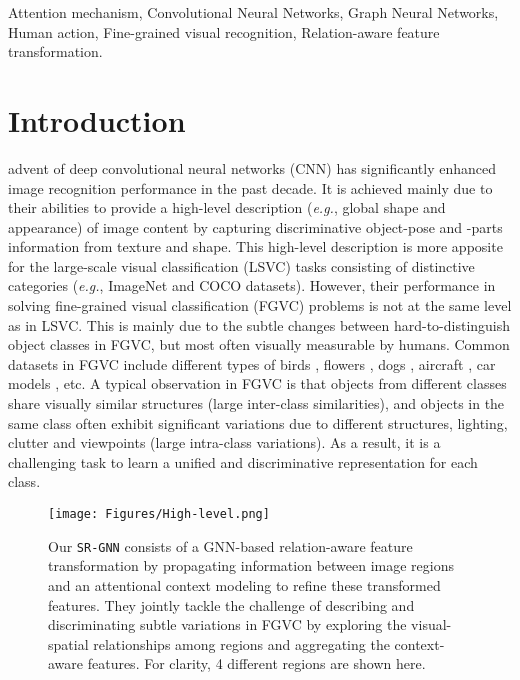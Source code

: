 \documentclass[journal]{IEEEtran}
\begin{document}
\begin{IEEEkeywords}
Attention mechanism, Convolutional Neural Networks, Graph Neural Networks, Human action, Fine-grained visual recognition, Relation-aware feature transformation.
\end{IEEEkeywords}

\IEEEpeerreviewmaketitle
\vspace{-0.2 cm}
\section{Introduction}
 advent of deep convolutional neural networks (CNN) has significantly enhanced image recognition performance in the past decade. It is achieved mainly due to their abilities to provide a high-level description (\textit{e.g.}, global shape and appearance) of image content by capturing discriminative object-pose and -parts information from texture and shape. This high-level description is more apposite for the large-scale visual classification (LSVC) tasks consisting of distinctive categories (\textit{e.g.}, ImageNet and COCO datasets). However, their performance in solving fine-grained visual classification (FGVC) problems is not at the same level as in LSVC. This is mainly due to the subtle changes between hard-to-distinguish object classes in FGVC, but most often visually measurable by humans. Common datasets in FGVC include  different types of birds \cite{wah2011caltech}, flowers \cite{nilsback2008automated}, dogs \cite{khosla2011novel}, aircraft \cite{maji2013fine}, car models \cite{krause20133d}, etc. A typical observation in FGVC is that objects from different classes share visually similar structures (large inter-class similarities), and objects in the same class often exhibit significant variations due to different structures, lighting, clutter and viewpoints (large intra-class variations). As a result, it is a challenging task to learn a unified and discriminative representation for each class.
\begin{figure}[t]
    \centering
    \texttt{[image: Figures/High-level.png]}
    \caption{Our \texttt{SR-GNN} consists of a GNN-based relation-aware feature transformation by propagating information between image regions and an attentional context modeling to refine these transformed features. They jointly tackle the challenge of describing and discriminating subtle variations in FGVC by exploring the visual-spatial relationships among regions and aggregating the context-aware features. For clarity, 4 different regions are shown here. }
    \label{fig:high_level}
    \vspace{-.5cm}
\end{figure}
\end{document}
